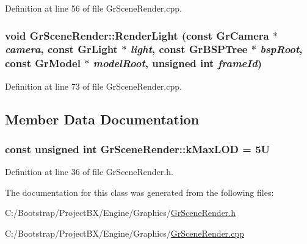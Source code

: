 Definition at line 56 of file GrSceneRender.cpp.\hypertarget{class_gr_scene_render_a476db0635147928ad7d0806303d60a3}{
\subsubsection[{RenderLight}]{\setlength{\rightskip}{0pt plus 5cm}void GrSceneRender::RenderLight (const {\bf GrCamera} $\ast$ {\em camera}, \/  const {\bf GrLight} $\ast$ {\em light}, \/  const {\bf GrBSPTree} $\ast$ {\em bspRoot}, \/  const {\bf GrModel} $\ast$ {\em modelRoot}, \/  unsigned int {\em frameId})}}
\label{class_gr_scene_render_a476db0635147928ad7d0806303d60a3}




Definition at line 73 of file GrSceneRender.cpp.

\subsection{Member Data Documentation}
\hypertarget{class_gr_scene_render_af3f39ad08e5db676b53f3025999caf3}{
\subsubsection[{kMaxLOD}]{\setlength{\rightskip}{0pt plus 5cm}const unsigned int {\bf GrSceneRender::kMaxLOD} = 5U}}
\label{class_gr_scene_render_af3f39ad08e5db676b53f3025999caf3}




Definition at line 36 of file GrSceneRender.h.

The documentation for this class was generated from the following files:\begin{CompactItemize}
\item 
C:/Bootstrap/ProjectBX/Engine/Graphics/\hyperlink{_gr_scene_render_8h}{GrSceneRender.h}\item 
C:/Bootstrap/ProjectBX/Engine/Graphics/\hyperlink{_gr_scene_render_8cpp}{GrSceneRender.cpp}\end{CompactItemize}
